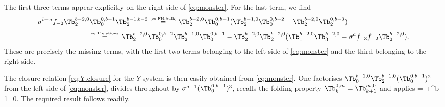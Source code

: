\documentclass[11pt]{article}
\numberwithin{equation}{section}
\theoremstyle{plain}
\numberwithin{equation}{section}
\begin{document}
The first three terms appear explicitly on the right side of \eqref{eq:monster}. For the last term, we find
\begin{alignat}{2}
\sigma^{b-a}f_{-2} \Tb^{b-2,0}_2\Tb^{0,b-1}_0 \Tb^{b-1,b-2}_2 &\overset{\textrm{\tiny\eqref{eq:FH.bulk}}}{=} \Tb^{b-2,0}_2\Tb^{0,b-1}_0 (\Tb^{b-1,0}_2 \Tb^{0,b-2}_0 - \Tb^{b-2,0}_2 \Tb^{0,b-3}_2)
\nonumber\\[0.1cm]
&\hspace{-3cm}\overset{\textrm{\tiny\eqref{eq:Trelations}}}{=} \Tb^{b-2,0}_2 \Tb^{0,b-2}_0 \Tb^{b-1,0}_2\Tb^{0,b-1}_0 - \Tb^{b-2,0}_2 \Tb^{b-2,0}_2(\Tb^{b-2,0}_1 \Tb^{b-2,0}_3 - \sigma^a f_{-3}f_{-2} \Tb^{b-2,0}_2).
\end{alignat}
These are precisely the missing terms, with the first two terms belonging to the left side of \eqref{eq:monster} and the third belonging to the right side.
\eproof

The closure relation \eqref{eq:Y.closure} for the $Y$-system is then easily obtained from \eqref{eq:monster}. One factorises $\Tb^{b-1,0}_0\Tb^{b-1,0}_2(\Tb^{0,b-1}_0)^2$ from the left side of \eqref{eq:monster}, divides throughout by $\sigma^{a-1}(\Tb^{0,b-1}_0)^3$, recalls the folding property $\Tb^{0,m}_k = \Tb^{m,0}_{k+1}$ and applies
\be
{} = \Ib+\tb^{b-1}_0.
\ee
The required result follows readily.
\end{document}
